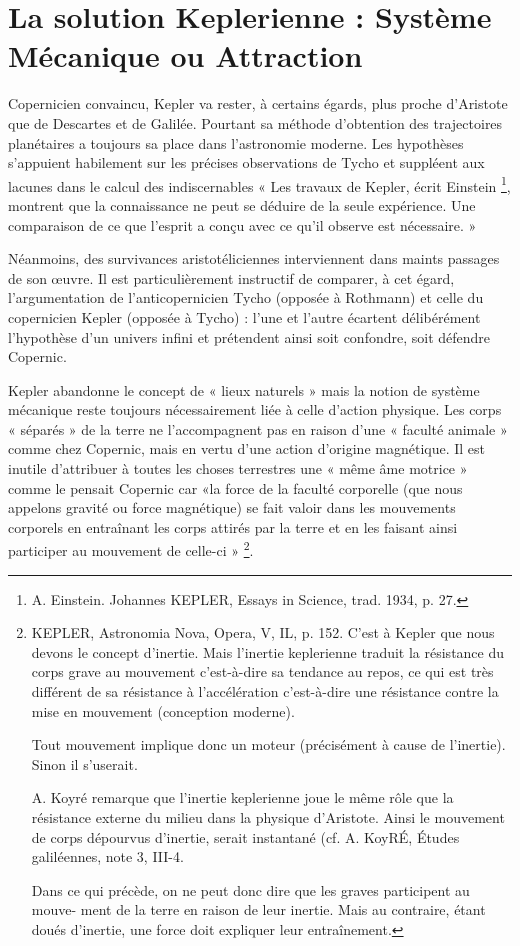 \section{La solution Keplerienne :
Système Mécanique ou Attraction}

Copernicien convaincu, Kepler va rester, à certains égards, plus
proche d’Aristote que de Descartes et de Galilée. Pourtant sa méthode
d’obtention des trajectoires planétaires a toujours sa place dans l’astronomie
moderne. Les hypothèses s’appuient habilement sur les précises
observations de Tycho et suppléent aux lacunes dans le calcul des indiscernables
« Les travaux de Kepler, écrit Einstein \footnote{A. Einstein. Johannes KEPLER, Essays in Science, trad. 1934, p. 27.}, montrent que la
connaissance ne peut se déduire de la seule expérience. Une comparaison
de ce que l’esprit a conçu avec ce qu’il observe est nécessaire. »

Néanmoins, des survivances aristotéliciennes interviennent dans maints
passages de son œuvre. Il est particulièrement instructif de comparer, à
cet égard, l’argumentation de l’anticopernicien Tycho (opposée à Rothmann)
et celle du copernicien Kepler (opposée à Tycho) : l’une et l’autre
écartent délibérément l’hypothèse d’un univers infini et prétendent ainsi
soit confondre, soit défendre Copernic.

Kepler abandonne le concept de « lieux naturels » mais la notion de
système mécanique reste toujours nécessairement liée à celle d’action
physique. Les corps « séparés » de la terre ne l’accompagnent pas en
raison d’une « faculté animale » comme chez Copernic, mais en vertu
d’une action d’origine magnétique. Il est inutile d’attribuer à toutes les
choses terrestres une « même âme motrice » comme le pensait Copernic
car «la force de la faculté corporelle (que nous appelons gravité ou
force magnétique) se fait valoir dans les mouvements corporels en entraînant
les corps attirés par la terre et en les faisant ainsi participer au
mouvement de celle-ci » \footnote{KEPLER, Astronomia Nova, Opera, V, IL, p. 152.
C’est à Kepler que nous devons le concept d’inertie. Mais l’inertie keplerienne
traduit la résistance du corps grave au mouvement c’est-à-dire sa tendance au repos,
ce qui est très différent de sa résistance à l’accélération c’est-à-dire une résistance
contre la mise en mouvement (conception moderne).

Tout mouvement implique donc un moteur (précisément à cause de l’inertie).
Sinon il s’userait.

A. Koyré remarque que l’inertie keplerienne joue le même rôle que la résistance
externe du milieu dans la physique d’Aristote. Ainsi le mouvement de corps dépourvus
d'inertie, serait instantané (cf. A. KoyRÉ, Études galiléennes, note 3, III-4.

Dans ce qui précède, on ne peut donc dire que les graves participent au mouve-
ment de la terre en raison de leur inertie. Mais au contraire, étant doués d’inertie,
une force doit expliquer leur entraînement.
}.

